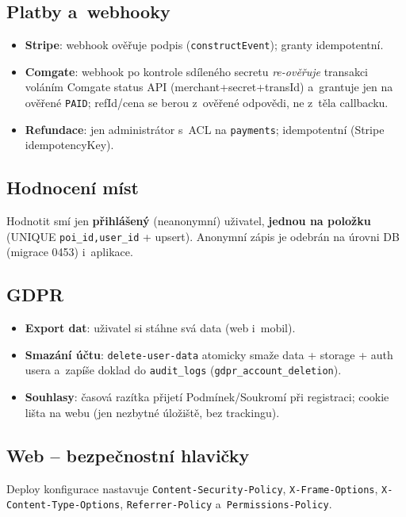 \documentclass[11pt,a4paper]{article}
\newcommand{\code}[1]{\texttt{#1}}
\begin{document}
\subsection{Platby a~webhooky}
\begin{itemize}[nosep]
  \item \textbf{Stripe}: webhook ověřuje podpis (\code{constructEvent}); granty idempotentní.
  \item \textbf{Comgate}: webhook po kontrole sdíleného secretu \emph{re-ověřuje} transakci
        voláním Comgate status API (merchant+secret+transId) a~grantuje jen na ověřené
        \code{PAID}; refId/cena se berou z~ověřené odpovědi, ne z~těla callbacku.
  \item \textbf{Refundace}: jen administrátor s~ACL na \code{payments}; idempotentní (Stripe idempotencyKey).
\end{itemize}

\subsection{Hodnocení míst}
Hodnotit smí jen \textbf{přihlášený} (neanonymní) uživatel, \textbf{jednou na položku}
(UNIQUE \code{poi\_id,user\_id} + upsert). Anonymní zápis je odebrán na úrovni DB
(migrace 0453) i~aplikace.

\subsection{GDPR}
\begin{itemize}[nosep]
  \item \textbf{Export dat}: uživatel si stáhne svá data (web i~mobil).
  \item \textbf{Smazání účtu}: \code{delete-user-data} atomicky smaže data + storage + auth
        usera a~zapíše doklad do \code{audit\_logs} (\code{gdpr\_account\_deletion}).
  \item \textbf{Souhlasy}: časová razítka přijetí Podmínek/Soukromí při registraci;
        cookie lišta na webu (jen nezbytné úložiště, bez trackingu).
\end{itemize}

\subsection{Web -- bezpečnostní hlavičky}
Deploy konfigurace nastavuje \code{Content-Security-Policy}, \code{X-Frame-Options},
\code{X-Content-Type-Options}, \code{Referrer-Policy} a~\code{Permissions-Policy}.
\end{document}
